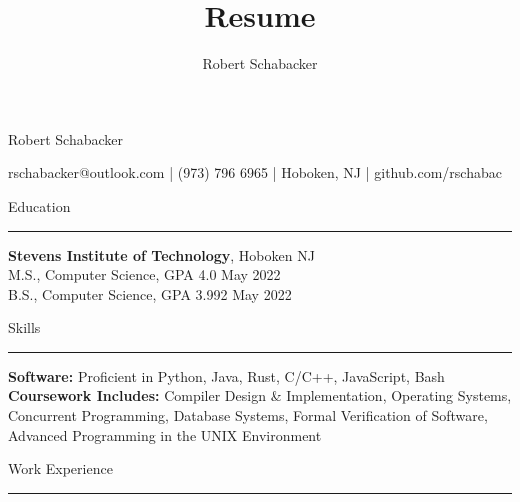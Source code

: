 \documentclass{article}
\title{Resume}
\author{Robert Schabacker}
\newcommand \spacingBetweenHeadings {0.3em}
\newcommand \spacingAfterHeadings {0.5em}
\begin{document}
\begin{center}
{\huge Robert Schabacker\par}
\vspace{0.3em}
{\Large rschabacker@outlook.com  |  (973) 796 6965  |  Hoboken, NJ  |  github.com/rschabac\par}
\end{center}
\vspace{-1.3em}
\vspace{\spacingBetweenHeadings}

\noindent
\huge Education\par
\vspace{0.1em}
\hrule
\Large
\vspace{\spacingAfterHeadings}
\noindent
\textbf{Stevens Institute of Technology}, Hoboken NJ\\
M.S., Computer Science, GPA 4.0
\hfill
May 2022\\
B.S., Computer Science, GPA 3.992
\hfill
May 2022



\vspace{\spacingBetweenHeadings}

\noindent
\huge Skills\par
\vspace{0.1em}
\hrule
\Large
\vspace{\spacingAfterHeadings}
\noindent
\textbf{Software:} Proficient in Python, Java, Rust, C/C++, JavaScript, Bash\\
\textbf{Coursework Includes:} Compiler Design \& Implementation, Operating Systems, Concurrent Programming, Database Systems, Formal Verification of Software, Advanced Programming in the UNIX Environment %


\vspace{\spacingBetweenHeadings}

\noindent
\huge Work Experience\par
\vspace{0.1em}
\hrule
\Large
\vspace{\spacingAfterHeadings}
\end{document}
